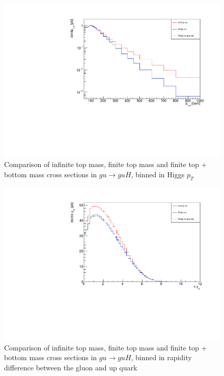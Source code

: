 \begin{figure}[t]
\centering
\includegraphics[scale=0.75]{Images/ptH_gu.pdf}
\caption{Comparison of infinite top mass, finite top mass and finite top + bottom mass cross sections in $gu \to guH$, binned in Higgs $p_T$ }
\label{fig:higgs_pt}
\end{figure}

\begin{figure}[H]
\centering
\includegraphics[scale=0.75]{Images/ydiff_gu.pdf}
\caption{Comparison of infinite top mass, finite top mass and finite top + bottom mass cross sections in $gu \to guH$, binned in rapidity difference between the gluon and up quark}
\label{fig:higgs_ydiff}
\end{figure}

